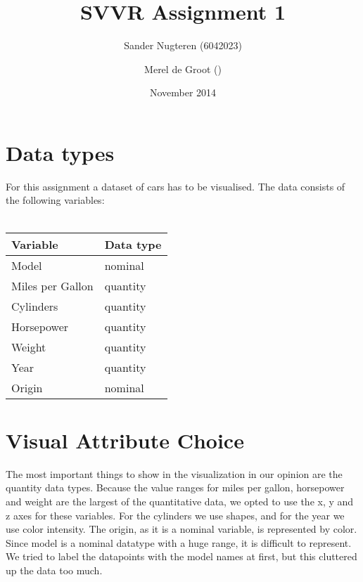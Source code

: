 \documentclass{article}
\title{SVVR Assignment 1}
\author{Sander Nugteren (6042023) \and Merel de Groot ()}
\date{November 2014}
\begin{document}
\section{Data types}
For this assignment a dataset of cars has to be visualised. The data consists
of the following variables:\\\\
\begin{tabular}{|l|l|}
	\hline
	Variable & Data type \\
	\hline
	Model & nominal \\
	Miles per Gallon & quantity \\
	Cylinders & quantity \\
	Horsepower & quantity \\
	Weight & quantity \\
	Year & quantity \\
	Origin & nominal\\
	\hline
\end{tabular}

\section{Visual Attribute Choice}
The most important things to show in the visualization in our opinion are the
quantity data types. Because the value ranges for miles per gallon, horsepower and
weight are the largest of the quantitative data, we opted to
use the x, y and z axes for these variables. For the cylinders we use shapes,
and for the year we use color intensity. The origin, as it is a nominal
variable, is represented by color. Since model is a nominal datatype with a
huge range, it is difficult to represent. We tried to label the datapoints with
the model names at first, but this cluttered up the data too much.
\end{document}

